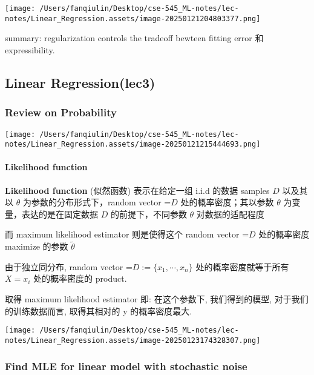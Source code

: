 \documentclass[
]{article}
\begin{document}
\texttt{[image: /Users/fanqiulin/Desktop/cse-545\_ML-notes/lec-notes/Linear\_Regression.assets/image-20250121204803377.png]}

summary: regularization controls the tradeoff bewteen fitting error 和
expressibility.

\hypertarget{linear-regressionlec3}{%
\subsection{Linear Regression(lec3)}\label{linear-regressionlec3}}

\hypertarget{review-on-probability}{%
\subsubsection{Review on Probability}\label{review-on-probability}}

\texttt{[image: /Users/fanqiulin/Desktop/cse-545\_ML-notes/lec-notes/Linear\_Regression.assets/image-20250121215444693.png]}

\hypertarget{likelihood-function}{%
\paragraph{Likelihood function}\label{likelihood-function}}

\textbf{Likelihood function} (似然函数) 表示在给定一组 i.i.d 的数据
samples \(D\) 以及其以 \(\theta\) 为参数的分布形式下，random vector
=\(D\) 处的概率密度；其以参数 \(\theta\) 为变量，表达的是在固定数据
\(D\) 的前提下，不同参数 \(\theta\) 对数据的适配程度

而 maximum likelihood estimator 则是使得这个 random vector =\(D\)
处的概率密度 maximize 的参数 \(\tilde{\theta}\)

由于独立同分布, random vector =\(D:=\{x_1,\cdots,x_n\}\)
处的概率密度就等于所有 \(X=x_i\) 处的概率密度的 product.

取得 maximum likelihood estimator 即: 在这个参数下, 我们得到的模型,
对于我们的训练数据而言, 取得其相对的 y 的概率密度最大.

\texttt{[image: /Users/fanqiulin/Desktop/cse-545\_ML-notes/lec-notes/Linear\_Regression.assets/image-20250123174328307.png]}

\hypertarget{find-mle-for-linear-model-with-stochastic-noise}{%
\subsubsection{Find MLE for linear model with stochastic
noise}\label{find-mle-for-linear-model-with-stochastic-noise}}
\end{document}
